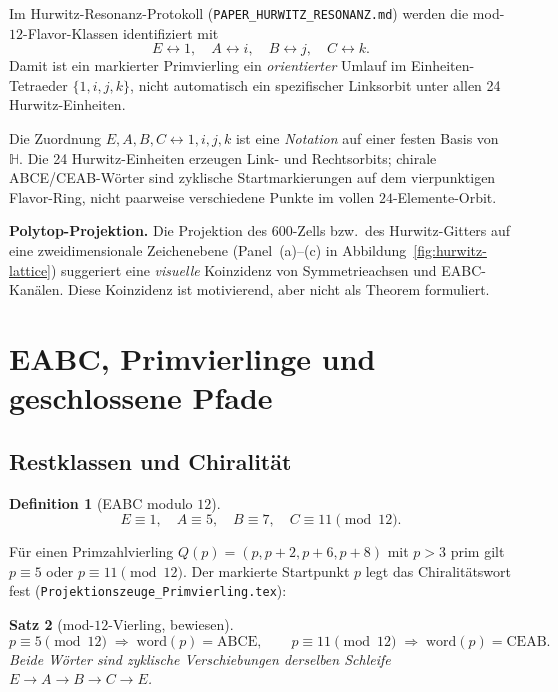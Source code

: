 \documentclass[12pt,a4paper]{article}
\newtheorem{satz}{Satz}[section]
\newtheorem{definition}[satz]{Definition}
\begin{document}
Im Hurwitz-Resonanz-Protokoll (\texttt{PAPER\_HURWITZ\_RESONANZ.md})
werden die mod-$12$-Flavor-Klassen identifiziert mit
\[
E\leftrightarrow 1,\quad
A\leftrightarrow i,\quad
B\leftrightarrow j,\quad
C\leftrightarrow k.
\]
Damit ist ein markierter Primvierling ein \emph{orientierter} Umlauf
im Einheiten-Tetraeder $\{1,i,j,k\}$, nicht automatisch ein
spezifischer Linksorbit unter allen 24 Hurwitz-Einheiten.

\begin{tcolorbox}[bewiesen]
Die Zuordnung $E,A,B,C \leftrightarrow 1,i,j,k$ ist eine
\emph{Notation} auf einer festen Basis von~$\mathbb{H}$.
Die 24 Hurwitz-Einheiten erzeugen Link- und Rechtsorbits;
chirale ABCE/CEAB-Wörter sind zyklische Startmarkierungen
auf dem vierpunktigen Flavor-Ring, nicht paarweise verschiedene
Punkte im vollen $24$-Elemente-Orbit.
\end{tcolorbox}

\begin{tcolorbox}[heuristik]
\textbf{Polytop-Projektion.}
Die Projektion des 600-Zells bzw.\ des Hurwitz-Gitters auf eine
zweidimensionale Zeichenebene (Panel~(a)--(c) in
Abbildung~\ref{fig:hurwitz-lattice}) suggeriert eine
\emph{visuelle} Koinzidenz von Symmetrieachsen und EABC-Kanälen.
Diese Koinzidenz ist motivierend, aber nicht als Theorem formuliert.
\end{tcolorbox}

\section{EABC, Primvierlinge und geschlossene Pfade}
\label{sec:primvierlinge}

\subsection{Restklassen und Chiralität}

\begin{definition}[EABC modulo $12$]
\[
E\equiv 1,\quad A\equiv 5,\quad B\equiv 7,\quad C\equiv 11 \pmod{12}.
\]
\end{definition}

Für einen Primzahlvierling $Q(p)=(p,p+2,p+6,p+8)$ mit $p>3$ prim gilt
$p\equiv 5$ oder $p\equiv 11\pmod{12}$. Der markierte Startpunkt $p$
legt das Chiralitätswort fest (\texttt{Projektionszeuge\_Primvierling.tex}):

\begin{satz}[mod-$12$-Vierling, bewiesen]
\[
p\equiv 5\pmod{12}\;\Longrightarrow\;\mathrm{word}(p)=\mathrm{ABCE},\qquad
p\equiv 11\pmod{12}\;\Longrightarrow\;\mathrm{word}(p)=\mathrm{CEAB}.
\]
Beide Wörter sind zyklische Verschiebungen derselben Schleife
$E\to A\to B\to C\to E$.
\end{satz}
\end{document}
